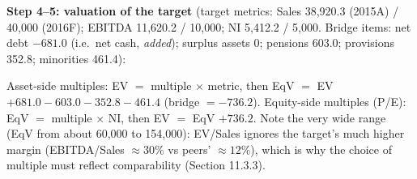 \begin{exbox}
\medskip
\textbf{Step 4--5: valuation of the target} (target metrics: Sales 38,920.3 (2015A) / 40,000 (2016F); EBITDA 11,620.2 / 10,000; NI 5,412.2 / 5,000. Bridge items: net debt $-681.0$ (i.e.\ net cash, \emph{added}); surplus assets 0; pensions 603.0; provisions 352.8; minorities 461.4):
\begin{center}
\scriptsize\setlength{\tabcolsep}{3pt}
\end{center}
Asset-side multiples: EV $=$ multiple $\times$ metric, then EqV $=$ EV $+681.0-603.0-352.8-461.4$ (bridge $=-736.2$). Equity-side multiples (P/E): EqV $=$ multiple $\times$ NI, then EV $=$ EqV $+736.2$. Note the very wide range (EqV from about 60,000 to 154,000): EV/Sales ignores the target's much higher margin (EBITDA/Sales $\approx30\%$ vs peers' $\approx12\%$), which is why the choice of multiple must reflect comparability (Section 11.3.3).
\end{exbox}

